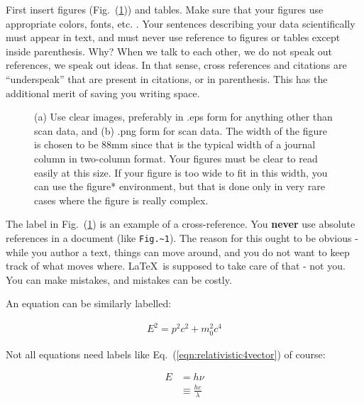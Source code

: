 \documentclass[12 pt]{article}
\begin{document}
First insert figures (Fig.~(\ref{fig:cv})) and tables. Make sure that your figures use appropriate colors, fonts, etc. \cite{mcnames:2006}. Your sentences describing your data scientifically must appear in text, and must never use reference to figures or tables except inside parenthesis. Why? When we talk to each other, we do not speak out references, we speak out ideas. In that sense, cross references and citations are ``underspeak'' that are present in citations, or in parenthesis. This has the additional merit of saving you writing space. 

\begin{figure}
\centering
{}
\caption{(a) Use clear images, preferably in .eps form for anything other than scan data, and (b) .png form for scan data. The width of the figure is chosen to be 88mm since that is the typical width of a journal column in two-column format. Your figures must be clear to read easily at this size. If your figure is too wide to fit in this width, you can use the figure* environment, but that is done only in very rare cases where the figure is really complex.}
\label{fig:cv}
\end{figure}

The label in Fig.~(\ref{fig:cv}) is an example of a cross-reference. You \textbf{never} use absolute references in a document (like \verb|Fig.~1|). The reason for this ought to be obvious - while you author a text, things can move around, and you do not want to keep track of what moves where. \LaTeX\ is supposed to take care of that - not you. You can make mistakes, and mistakes can be costly.

An equation can be similarly labelled:

\begin{align}
  E^{2} = p^{2} c^{2} + m_{0}^{2} c^{4} \label{eqn:relativistic4vector}
\end{align}

Not all equations need labels like Eq.~(\ref{eqn:relativistic4vector}) of course:

\begin{align}
  E & = h\nu \nonumber \\
  & \equiv \frac{h c}{\lambda} \label{eqn:plancksrelationship}
\end{align}
\end{document}
